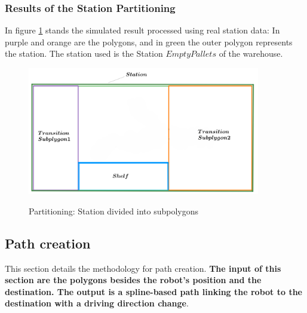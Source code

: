 \subsubsection{Results of the Station Partitioning}

In figure \ref{Station polygon} stands the simulated result processed using real station data: In purple and orange are 
the polygons, and in green the outer polygon represents the station.
The station used is the Station \(Empty Pallets\) of the warehouse.

\begin{figure}[H]
    \begin{center}
        \includegraphics[width=4in]{images/Chap2/subpolygons.png}\\
        \caption{Partitioning: Station divided into subpolygons}
        \label{Station polygon}
        \end{center}    
\end{figure}


\subsection{Path creation}
This section details the methodology for path creation. \textbf{The input of this section are the polygons besides
the robot's position and the destination. The output is a spline-based path linking the robot to the destination with a 
driving direction change}.

